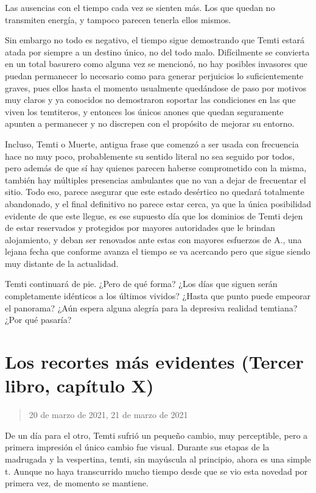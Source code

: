\documentclass[
  spanish,
]{book}
\begin{document}
Las ausencias con el tiempo cada vez se sienten más. Los que quedan no transmiten energía, y tampoco parecen tenerla ellos mismos.

Sin embargo no todo es negativo, el tiempo sigue demostrando que Temti estará atada por siempre a un destino único, no del todo malo. Difícilmente se convierta en un total basurero como alguna vez se mencionó, no hay posibles invasores que puedan permanecer lo necesario como para generar perjuicios lo suficientemente graves, pues ellos hasta el momento usualmente quedándose de paso por motivos muy claros y ya conocidos no demostraron soportar las condiciones en las que viven los temtiteros, y entonces los únicos anones que quedan seguramente apunten a permanecer y no discrepen con el propósito de mejorar su entorno.

Incluso, Temti o Muerte, antigua frase que comenzó a ser usada con frecuencia hace no muy poco, probablemente su sentido literal no sea seguido por todos, pero además de que sí hay quienes parecen haberse comprometido con la misma, también hay múltiples presencias ambulantes que no van a dejar de frecuentar el sitio. Todo eso, parece asegurar que este estado desértico no quedará totalmente abandonado, y el final definitivo no parece estar cerca, ya que la única posibilidad evidente de que este llegue, es ese supuesto día que los dominios de Temti dejen de estar reservados y protegidos por mayores autoridades que le brindan alojamiento, y deban ser renovados ante estas con mayores esfuerzos de A., una lejana fecha que conforme avanza el tiempo se va acercando pero que sigue siendo muy distante de la actualidad.

Temti continuará de pie. ¿Pero de qué forma? ¿Los días que siguen serán completamente idénticos a los últimos vividos? ¿Hasta que punto puede empeorar el panorama? ¿Aún espera alguna alegría para la depresiva realidad temtiana? ¿Por qué pasaría?

\hypertarget{los-recortes-muxe1s-evidentes-tercer-libro-capuxedtulo-x}{%
\section{Los recortes más evidentes (Tercer libro, capítulo X)}\label{los-recortes-muxe1s-evidentes-tercer-libro-capuxedtulo-x}}

\begin{quote}
20 de marzo de 2021, 21 de marzo de 2021
\end{quote}

De un día para el otro, Temti sufrió un pequeño cambio, muy perceptible, pero a primera impresión el único cambio fue visual. Durante sus etapas de la madrugada y la vespertina, temti, sin mayúscula al principio, ahora es una simple t. Aunque no haya transcurrido mucho tiempo desde que se vio esta novedad por primera vez, de momento se mantiene.
\end{document}
